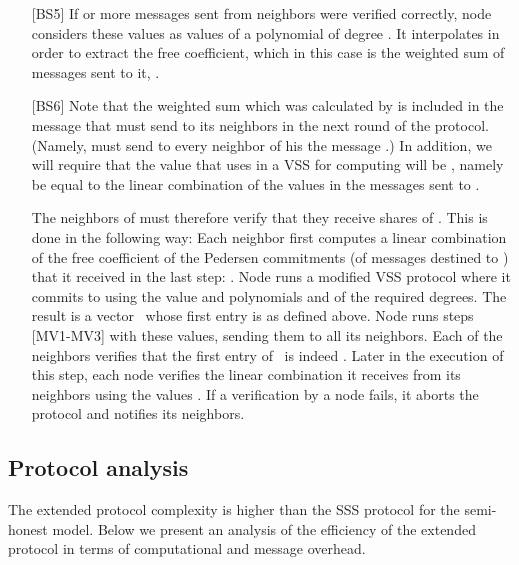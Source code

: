 \documentclass[10pt]{svjour3}
\begin{document}
\begin{itemize}
\item [{[BS5]}] If  or more messages sent from neighbors were verified
      correctly, node  considers these  values as values of a
      polynomial  of degree . It interpolates  in
      order to extract the free coefficient, which in this case is the
      weighted sum of messages sent to it, .

    \item [{[BS6]}] Note that the weighted sum  which was calculated by  is included in the message
      that  must send to its neighbors in the next round of the
      protocol. (Namely,  must send to every neighbor  of his
      the message .) In addition, we will require that the
       value that  uses in a VSS for computing 
      will be , namely be equal to the
      linear combination of the  values in the messages sent to .

      The neighbors of  must therefore verify that they receive
      shares of .  This is done in the following way: Each
      neighbor  first computes a linear combination of the free
      coefficient of the Pedersen commitments (of messages destined to
      ) that it received in the last
      step: . Node  runs a modified VSS
      protocol where it commits to  using the value  and
      polynomials  and  of the required degrees. The result is a
      vector \ whose first entry is  as defined
      above.  Node  runs steps [MV1-MV3] with these values,
      sending them to all its neighbors. Each of the neighbors
      verifies that the first entry of \  is indeed
      .
Later in the execution of  this step,
      each node  verifies the linear combination it receives from its
      neighbors  using  the values  .
If a verification by a node fails, it
      aborts the protocol and notifies its neighbors.



\end{itemize}







\subsection{Protocol analysis}
\label{prot_analysis}

The extended protocol complexity is higher than the SSS protocol
for the semi-honest model. Below we present an
analysis of the efficiency of the extended protocol in terms of
computational and message overhead.
\end{document}
